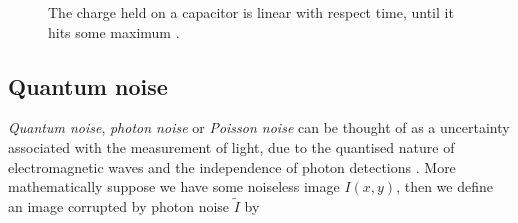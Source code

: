 \documentclass[12pt,twoside,notitlepage]{report}
\begin{document}
            \begin{figure}[H]
                \centering


                \caption{The charge held on a capacitor is linear with respect time, until it hits some maximum \cite{gamal2005cmos}.}
                \label{fig:linear_charge_wrt_photon_rate}
            \end{figure}


        \subsection{Quantum noise}
            \textit{Quantum noise}, \textit{photon noise} or \textit{Poisson noise} can be thought of as a uncertainty 
            associated with the measurement of light, due to the quantised nature of electromagnetic waves and the 
            independence of photon detections \cite{hasinoff2014photon}. More mathematically suppose we have some 
            noiseless image $I(x,y)$, then we define an image corrupted by photon noise $\tilde{I}$ by
\end{document}
